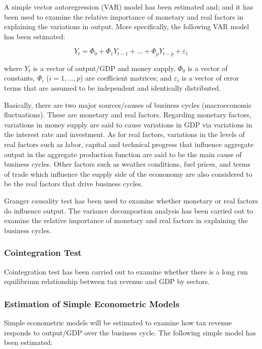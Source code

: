 \documentclass[12pt,a4paper,final]{article}
\begin{document}
A simple vector autoregression (VAR) model has been estimated and; and it has been used to examine the relative importance of monetary and real factors in explaining the variations in output. More specifically, the following VAR model has been estimated:

\[ Y_t = \Phi_0 +\Phi_1 Y_{t-1} + \ldots + \Phi_p Y_{t-p} + \varepsilon_t \]

where $Y_t$ is a vector of output/GDP and money supply, $\Phi_0$ is a vector of constants, $\Phi_i$ ($i=1,\ldots,p$) are coefficient matrices; and $\varepsilon_t$ is a vector of error terms that are assumed to be independent and identically distributed.

Basically, there are two major sources/causes of business cycles (macroeconomic fluctuations).  These are monetary and real factors. Regarding monetary factors, variations in money supply are said to cause variations in GDP via variations in the interest rate and investment. As for real factors, variations in the levels of real factors such as labor, capital and technical progress that influence aggregate output in the aggregate production function are said to be the main cause of business cycles. Other factors such as weather conditions, fuel prices, and terms of trade which influence the supply side of the econonomy are also considered to be the real factors that drive business cycles.

Granger causality test has been used to examine whether monetary or real factors do influence output. The variance decompostion analysis has been carried out to examine the relative importance of monetary and real factors in explaining the business cycles.

\subsubsection{Cointegration Test}

Cointegration test has been carried out to examine whether there is a long run equilibrium relationship between tax revenue and GDP by sectors.

\subsubsection{Estimation of Simple Econometric Models}

Simple econometric models will be estimated to examine how tax revenue responds to  output/GDP over the business cycle. The following simple model has been estimated:
\end{document}
